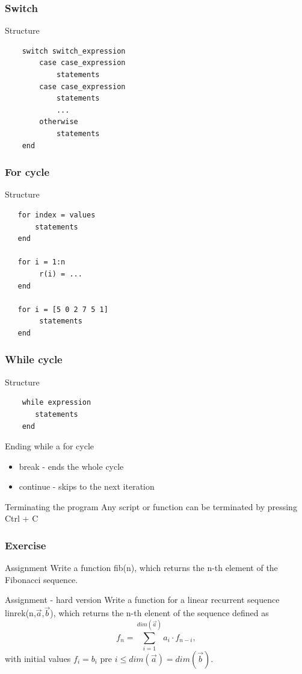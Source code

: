 \documentclass{beamer}
\begin{document}
\begin{frame}[fragile]
\frametitle{Switch}
  \begin{block}{Structure}
  \begin{verbatim}
    switch switch_expression
        case case_expression
            statements
        case case_expression
            statements
            ...
        otherwise
            statements
    end \end{verbatim}
  \end{block}
\end{frame}

\begin{frame}[fragile]
\frametitle{For cycle}
  \begin{block}{Structure}
  \begin{verbatim}
   for index = values
       statements
   end
   
   for i = 1:n
       	r(i) = ...
   end
   
   for i = [5 0 2 7 5 1]
       	statements
   end \end{verbatim}
  \end{block}
\end{frame}

\begin{frame}[fragile]
\frametitle{While cycle}
  \begin{block}{Structure}
  \begin{verbatim}
    while expression
       statements
    end \end{verbatim}
  \end{block}
  
  \pause
  
  \begin{block}{Ending while a for cycle}
  \begin{itemize}
      \item break - ends the whole cycle
      \item continue - skips to the next iteration
  \end{itemize}
  \end{block}
  
  \pause
  
  \begin{alertblock}{Terminating the program}
    Any script or function can be terminated by pressing Ctrl + C
  \end{alertblock}  
\end{frame}

\begin{frame}
\frametitle{Exercise}
  \begin{block}{Assignment}
  Write a function fib(n), which returns the n-th element of the Fibonacci sequence.
  \end{block}

  \begin{block}{Assignment - hard version}
  Write a function for a linear recurrent sequence linrek(n,$\vec{a}$,$\vec{b}$), which returns the n-th elenent of the sequence defined as $$f_n = \sum_{i = 1}^{dim(\vec{a})} a_i \cdot f_{n-i},$$ with initial values $f_i = b_i$ pre $i \leq dim(\vec{a}) = dim(\vec{b})$.
  \end{block}
\end{frame}  
\end{document}
